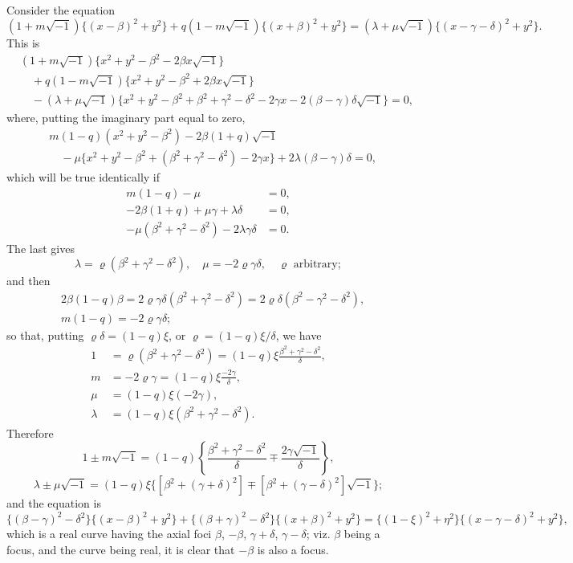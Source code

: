 \documentclass[11pt,a4paper]{book}
\begin{document}
\begin{solution}
Consider the equation
\[
(1+m\sqrt{-1})\{(x-\beta)^2+y^2\} + q(1-m\sqrt{-1})\{(x+\beta)^2+y^2\} = (\lambda+\mu\sqrt{-1})\{(x-\gamma-\delta)^2+y^2\}.
\]
This is
\[
\begin{aligned}
&(1+m\sqrt{-1})\{x^2+y^2-\beta^2-2\beta x\sqrt{-1}\} \\
&\quad + q(1-m\sqrt{-1})\{x^2+y^2-\beta^2+2\beta x\sqrt{-1}\} \\
&\quad - (\lambda+\mu\sqrt{-1})\{x^2+y^2-\beta^2+\beta^2+\gamma^2-\delta^2-2\gamma x - 2(\beta-\gamma)\delta\sqrt{-1}\} = 0,
\end{aligned}
\]
where, putting the imaginary part equal to zero,
\[
\begin{aligned}
&m(1-q)(x^2+y^2-\beta^2) - 2\beta(1+q)\sqrt{-1} \\
&\quad - \mu\{x^2+y^2-\beta^2+(\beta^2+\gamma^2-\delta^2)-2\gamma x\} + 2\lambda(\beta-\gamma)\delta = 0,
\end{aligned}
\]
which will be true identically if
\[
\begin{aligned}
m(1-q) - \mu &= 0, \\
-2\beta(1+q) + \mu\gamma + \lambda\delta &= 0, \\
-\mu(\beta^2+\gamma^2-\delta^2) - 2\lambda\gamma\delta &= 0.
\end{aligned}
\]
The last gives
\[
\lambda = \varrho(\beta^2+\gamma^2-\delta^2), \quad \mu = -2\varrho\gamma\delta, \quad \varrho \text{ arbitrary};
\]
and then
\[
\begin{aligned}
&2\beta(1-q)\beta = 2\varrho\gamma\delta(\beta^2+\gamma^2-\delta^2) = 2\varrho\delta(\beta^2-\gamma^2-\delta^2), \\
&m(1-q) = -2\varrho\gamma\delta;
\end{aligned}
\]
so that, putting $\varrho\delta = (1-q)\xi$, or $\varrho = (1-q)\xi/\delta$, we have
\[
\begin{aligned}
1 &= \varrho(\beta^2+\gamma^2-\delta^2) = (1-q)\xi\frac{\beta^2+\gamma^2-\delta^2}{\delta}, \\
m &= -2\varrho\gamma = (1-q)\xi\frac{-2\gamma}{\delta}, \\
\mu &= (1-q)\xi(-2\gamma), \\
\lambda &= (1-q)\xi(\beta^2+\gamma^2-\delta^2).
\end{aligned}
\]
Therefore
\[
1 \pm m\sqrt{-1} = (1-q)\left\{\frac{\beta^2+\gamma^2-\delta^2}{\delta} \mp \frac{2\gamma\sqrt{-1}}{\delta}\right\},
\]
\[
\lambda \pm \mu\sqrt{-1} = (1-q)\xi\{[\beta^2+(\gamma+\delta)^2] \mp [\beta^2+(\gamma-\delta)^2]\sqrt{-1}\};
\]
and the equation is
\[
\{(\beta-\gamma)^2-\delta^2\}\{(x-\beta)^2+y^2\} + \{(\beta+\gamma)^2-\delta^2\}\{(x+\beta)^2+y^2\} = \{(1-\xi)^2+\eta^2\}\{(x-\gamma-\delta)^2+y^2\},
\]
which is a real curve having the axial foci $\beta$, $-\beta$, $\gamma+\delta$, $\gamma-\delta$; viz. $\beta$ being a focus, and the curve being real, it is clear that $-\beta$ is also a focus.
\end{solution}
\end{document}
